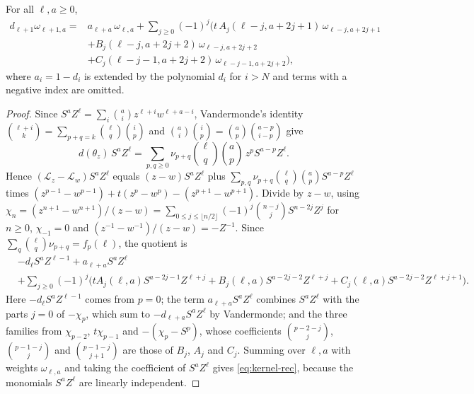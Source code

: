 \begin{lemma}\label{lem:kernel-rec}
For all $\ell,a\geq0$,
\begin{equation}\label{eq:kernel-rec}
\begin{aligned}
d_{\ell+1}\omega_{\ell+1,a}={}&a_{\ell+a}\,\omega_{\ell,a}+\sum_{j\geq0}(-1)^j\Big(t\,A_j(\ell-j,a+2j+1)\,\omega_{\ell-j,a+2j+1}\\
&+B_j(\ell-j,a+2j+2)\,\omega_{\ell-j,a+2j+2}\\
&+C_j(\ell-j-1,a+2j+2)\,\omega_{\ell-j-1,a+2j+2}\Big),
\end{aligned}
\end{equation}
where $a_i=1-d_i$ is extended by the polynomial $d_i$ for $i>N$ and terms with a negative index are omitted.
\end{lemma}
\begin{proof}
Since $S^aZ^\ell=\sum_i\binom ai z^{\ell+i}w^{\ell+a-i}$, Vandermonde's identity $\binom{\ell+i}k=\sum_{p+q=k}\binom\ell q\binom ip$ and $\binom ai\binom ip=\binom ap\binom{a-p}{i-p}$ give
\[
d(\theta_z)\,S^aZ^\ell=\sum_{p,q\geq0}\nu_{p+q}\binom\ell q\binom ap\,z^pS^{a-p}Z^\ell .
\]
Hence $(\mathcal L_z-\mathcal L_w)S^aZ^\ell$ equals $(z-w)S^aZ^\ell$ plus $\sum_{p,q}\nu_{p+q}\binom\ell q\binom ap S^{a-p}Z^\ell$ times $(z^{p-1}-w^{p-1})+t(z^p-w^p)-(z^{p+1}-w^{p+1})$. Divide by $z-w$, using $\chi_n=(z^{n+1}-w^{n+1})/(z-w)=\sum_{0\leq j\leq\lfloor n/2\rfloor}(-1)^j\binom{n-j}jS^{n-2j}Z^j$ for $n\geq0$, $\chi_{-1}=0$ and $(z^{-1}-w^{-1})/(z-w)=-Z^{-1}$. Since $\sum_q\binom\ell q\nu_{p+q}=f_p(\ell)$, the quotient is
\[
\begin{aligned}
&-d_\ell S^aZ^{\ell-1}+a_{\ell+a}S^aZ^\ell\\
&+\sum_{j\geq0}(-1)^j\Big(tA_j(\ell,a)S^{a-2j-1}Z^{\ell+j}+B_j(\ell,a)S^{a-2j-2}Z^{\ell+j}+C_j(\ell,a)S^{a-2j-2}Z^{\ell+j+1}\Big).
\end{aligned}
\]
Here $-d_\ell S^aZ^{\ell-1}$ comes from $p=0$; the term $a_{\ell+a}S^aZ^\ell$ combines $S^aZ^\ell$ with the parts $j=0$ of $-\chi_p$, which sum to $-d_{\ell+a}S^aZ^\ell$ by Vandermonde; and the three families from $\chi_{p-2}$, $t\chi_{p-1}$ and $-(\chi_p-S^p)$, whose coefficients $\binom{p-2-j}j$, $\binom{p-1-j}j$ and $\binom{p-1-j}{j+1}$ are those of $B_j$, $A_j$ and $C_j$. Summing over $\ell,a$ with weights $\omega_{\ell,a}$ and taking the coefficient of $S^aZ^\ell$ gives \eqref{eq:kernel-rec}, because the monomials $S^aZ^\ell$ are linearly independent.
\end{proof}

